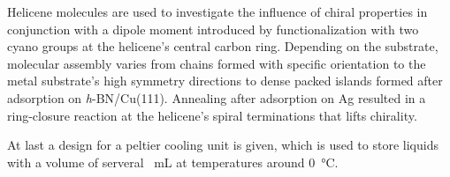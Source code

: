 Helicene molecules are used to investigate the influence of chiral properties in conjunction with a dipole moment introduced by functionalization with two cyano groups at the helicene's central carbon ring. Depending on the substrate, molecular assembly varies from chains formed with specific orientation to the metal substrate's high symmetry directions to dense packed islands formed after adsorption on \textit{h}-BN/Cu(111). Annealing after adsorption on Ag resulted in a ring-closure reaction at the helicene's spiral terminations that lifts chirality.

At last a design for a peltier cooling unit is given, which is used to store liquids with a volume of serveral \SI{}{\milli \liter} at temperatures around \SI{0}{\celsius}.